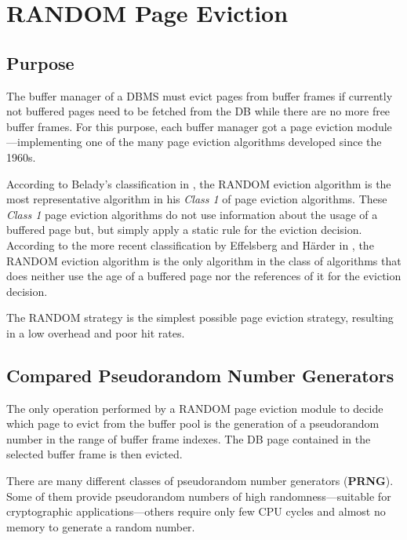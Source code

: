 \chapter[RANDOM Page Eviction]{RANDOM Page Eviction} \label{ch:random}

\section[Purpose]{Purpose}

    The buffer manager of a DBMS must evict pages from buffer frames if currently not buffered pages need to be fetched from the DB while there are no more free buffer frames. For this purpose, each buffer manager got a page eviction module---implementing one of the many page eviction algorithms developed since the 1960s.

    According to Belady's classification in \cite{Belady:1966}, the RANDOM eviction algorithm is the most representative algorithm in his \textit{Class 1} of page eviction algorithms. These \textit{Class 1} page eviction algorithms do not use information about the usage of a buffered page but, but simply apply a static rule for the eviction decision. According to the more recent classification by Effelsberg and Härder in \cite{Effelsberg:1984}, the RANDOM eviction algorithm is the only algorithm in the class of algorithms that does neither use the age of a buffered page nor the references of it for the eviction decision.

    The RANDOM strategy is the simplest possible page eviction strategy, resulting in a low overhead and poor hit rates.

\section[Compared Pseudorandom Number Generators]{Compared Pseudorandom Number Generators}

    The only operation performed by a RANDOM page eviction module to decide which page to evict from the buffer pool is the generation of a pseudorandom number in the range of buffer frame indexes. The DB page contained in the selected buffer frame is then evicted.

    There are many different classes of pseudorandom number generators (\textbf{PRNG}). Some of them provide pseudorandom numbers of high randomness---suitable for cryptographic applications---others require only few CPU cycles and almost no memory to generate a random number.

